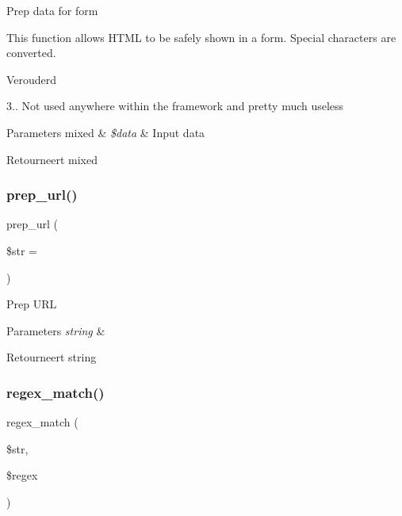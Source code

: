 Prep data for form

This function allows H\+T\+ML to be safely shown in a form. Special characters are converted.

\begin{DoxyRefDesc}{Verouderd}
\item[\mbox{\hyperlink{deprecated__deprecated000019}{Verouderd}}]3.. Not used anywhere within the framework and pretty much useless \end{DoxyRefDesc}

\begin{DoxyParams}[1]{Parameters}
mixed & {\em \$data} & Input data \\
\hline
\end{DoxyParams}
\begin{DoxyReturn}{Retourneert}
mixed 
\end{DoxyReturn}
\mbox{\label{class_c_i___form__validation_a1218a70d68fe797013a53b3c7cd41d2f}} 
\subsubsection{\texorpdfstring{prep\_url()}{prep\_url()}}
{\footnotesize\ttfamily prep\+\_\+url (\begin{DoxyParamCaption}\item[{}]{\$str = {\ttfamily \textquotesingle{}\textquotesingle{}} }\end{DoxyParamCaption})}

Prep U\+RL


\begin{DoxyParams}{Parameters}
{\em string} & \\
\hline
\end{DoxyParams}
\begin{DoxyReturn}{Retourneert}
string 
\end{DoxyReturn}
\mbox{\label{class_c_i___form__validation_acef19e29276dbdd2c69dffd5ec635600}} 
\subsubsection{\texorpdfstring{regex\_match()}{regex\_match()}}
{\footnotesize\ttfamily regex\+\_\+match (\begin{DoxyParamCaption}\item[{}]{\$str,  }\item[{}]{\$regex }\end{DoxyParamCaption})}

